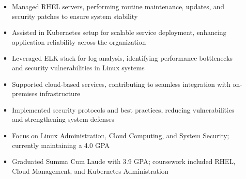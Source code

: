 \par\smallskip
\noindent
\begin{minipage}{20cm}
  \begin{minipage}{9.75cm}
    \begin{itemize}
      \item Managed RHEL servers, performing routine maintenance, updates, and security patches to ensure system stability
      \item Assisted in Kubernetes setup for scalable service deployment, enhancing application reliability across the organization
      \item Leveraged ELK stack for log analysis, identifying performance bottlenecks and security vulnerabilities in Linux systems
    \end{itemize}
  \end{minipage}
  \hfill
  \begin{minipage}{9.75cm}
    \begin{itemize}
      \item Supported cloud-based services, contributing to seamless integration with on-premises infrastructure
      \item Implemented security protocols and best practices, reducing vulnerabilities and strengthening system defenses
    \end{itemize}
  \end{minipage}
\end{minipage}

\begin{itemize}
  \item Focus on Linux Administration, Cloud Computing, and System Security; currently maintaining a 4.0 GPA
\end{itemize}
\divider

\begin{itemize}
  \item Graduated Summa Cum Laude with 3.9 GPA; coursework included RHEL, Cloud Management, and Kubernetes Administration
\end{itemize}

\noindent
\begin{minipage}{20cm}
     
     
     
\end{minipage}


